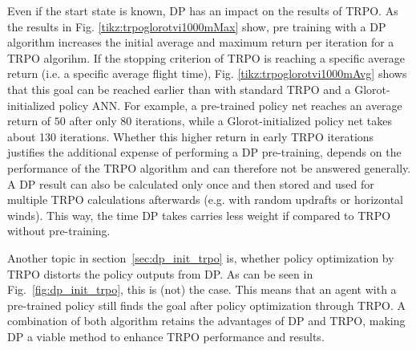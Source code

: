 Even if the start state is known, DP has an impact on the results of TRPO. As the results in Fig. \ref{tikz:trpoglorotvi1000mMax} show, pre training with a DP algorithm increases the initial average and maximum return per iteration for a TRPO algorihm. If the stopping criterion of TRPO is reaching a specific average return (i.e. a specific average flight time), Fig. \ref{tikz:trpoglorotvi1000mAvg} shows that this goal can be reached earlier than with standard TRPO and a Glorot-initialized policy ANN. For example, a pre-trained policy net reaches an average return of $50$ after only 80 iterations, while a Glorot-initialized policy net takes about 130 iterations. Whether this higher return in early TRPO iterations justifies the additional expense of performing a DP pre-training, depends on the performance of the TRPO algorithm and can therefore not be answered generally. A DP result can also be calculated only once and then stored and used for multiple TRPO calculations afterwards (e.g. with random updrafts or horizontal winds). This way, the time DP takes carries less weight if compared to TRPO without pre-training.

Another topic in section~\ref{sec:dp_init_trpo} is, whether policy optimization by TRPO distorts the policy outputs from DP. As can be seen in Fig.~\ref{fig:dp_init_trpo}, this is (not) the case. This means that an agent with a pre-trained policy still finds the goal after policy optimization through TRPO. A combination of both algorithm retains the advantages of DP and TRPO, making DP a viable method to enhance TRPO performance and results.